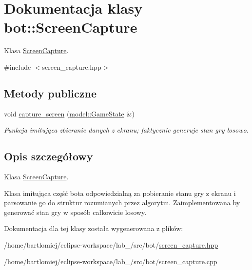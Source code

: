 \hypertarget{classbot_1_1ScreenCapture}{}\section{Dokumentacja klasy bot\+:\+:Screen\+Capture}
\label{classbot_1_1ScreenCapture}


Klasa \hyperlink{classbot_1_1ScreenCapture}{Screen\+Capture}.  




{\ttfamily \#include $<$screen\+\_\+capture.\+hpp$>$}

\subsection*{Metody publiczne}
\begin{DoxyCompactItemize}
\item 
\mbox{\label{classbot_1_1ScreenCapture_a489528b1e3ab2a393801e2e712d2c998}} 
void \hyperlink{classbot_1_1ScreenCapture_a489528b1e3ab2a393801e2e712d2c998}{capture\+\_\+screen} (\hyperlink{structmodel_1_1GameState}{model\+::\+Game\+State} \&)
\begin{DoxyCompactList}\small\item\em Funkcja imitująca zbieranie danych z ekranu; faktycznie generuje stan gry losowo. \end{DoxyCompactList}\end{DoxyCompactItemize}


\subsection{Opis szczegółowy}
Klasa \hyperlink{classbot_1_1ScreenCapture}{Screen\+Capture}. 

Klasa imitująca część bota odpowiedzialną za pobieranie stanu gry z ekranu i parsowanie go do struktur rozumianych przez algorytm. Zaimplementowana by generować stan gry w sposób całkowicie losowy. 

Dokumentacja dla tej klasy została wygenerowana z plików\+:\begin{DoxyCompactItemize}
\item 
/home/bartlomiej/eclipse-\/workspace/lab\+\_/src/bot/\hyperlink{screen__capture_8hpp}{screen\+\_\+capture.\+hpp}\item 
/home/bartlomiej/eclipse-\/workspace/lab\+\_/src/bot/screen\+\_\+capture.\+cpp\end{DoxyCompactItemize}
